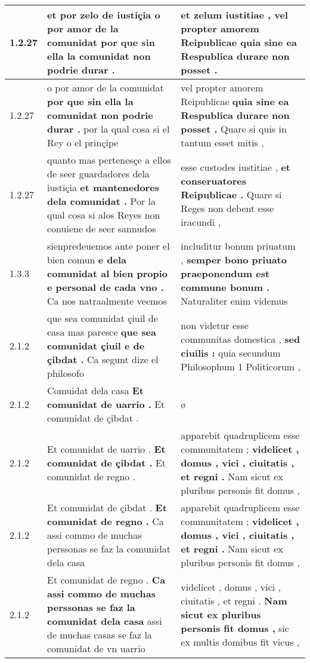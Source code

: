 \begin{tabular}{|p{1cm}|p{6.5cm}|p{6.5cm}|}
1.2.27 & et por zelo de iustiçia \textbf{ o por amor de la comunidat } por que sin ella la comunidat non podrie durar . & et zelum iustitiae , \textbf{ vel propter amorem Reipublicae } quia sine ea Respublica durare non posset . \\\hline
1.2.27 & o por amor de la comunidat \textbf{ por que sin ella la comunidat non podrie durar . } por la qual cosa si el Rey o el prinçipe & vel propter amorem Reipublicae \textbf{ quia sine ea Respublica durare non posset . } Quare si quis in tantum esset mitis , \\\hline
1.2.27 & quanto mas pertenesçe a ellos de seer guardadores dela iustiçia \textbf{ et mantenedores dela comunidat . } Por la qual cosa si alos Reyes non conuiene de seer sannudos & esse custodes iustitiae , \textbf{ et conseruatores Reipublicae . } Quare si Reges non debent esse iracundi , \\\hline
1.3.3 & sienpredeuemos ante poner el bien comun \textbf{ e dela comunidat al bien propio e personal de cada vno . } Ca nos natraalmente veemos & includitur bonum priuatum , \textbf{ semper bono priuato praeponendum est commune bonum . } Naturaliter enim videmus \\\hline
2.1.2 & que sea comunidat çiuil de casa mas paresce \textbf{ que sea comunidat çiuil e de çibdat . } Ca segunt dize el philosofo & non videtur esse communitas domestica , \textbf{ sed ciuilis : } quia secundum Philosophum 1 Politicorum , \\\hline
2.1.2 & Comuidat dela casa \textbf{ Et comunidat de uarrio . } Et comunidat de çibdat . & ø \\\hline
2.1.2 & Et comunidat de uarrio . \textbf{ Et comunidat de çibdat . } Et comunidat de regno . & apparebit quadruplicem esse communitatem ; \textbf{ videlicet , domus , vici , ciuitatis , et regni . } Nam sicut ex pluribus personis fit domus , \\\hline
2.1.2 & Et comunidat de çibdat . \textbf{ Et comunidat de regno . } Ca assi commo de muchas perssonas se faz la comunidat dela casa & apparebit quadruplicem esse communitatem ; \textbf{ videlicet , domus , vici , ciuitatis , et regni . } Nam sicut ex pluribus personis fit domus , \\\hline
2.1.2 & Et comunidat de regno . \textbf{ Ca assi commo de muchas perssonas se faz la comunidat dela casa } assi de muchas casas se faz la comunidat de vn uarrio & videlicet , domus , vici , ciuitatis , et regni . \textbf{ Nam sicut ex pluribus personis fit domus , } sic ex multis domibus fit vicus , \\\hline

\end{tabular}

